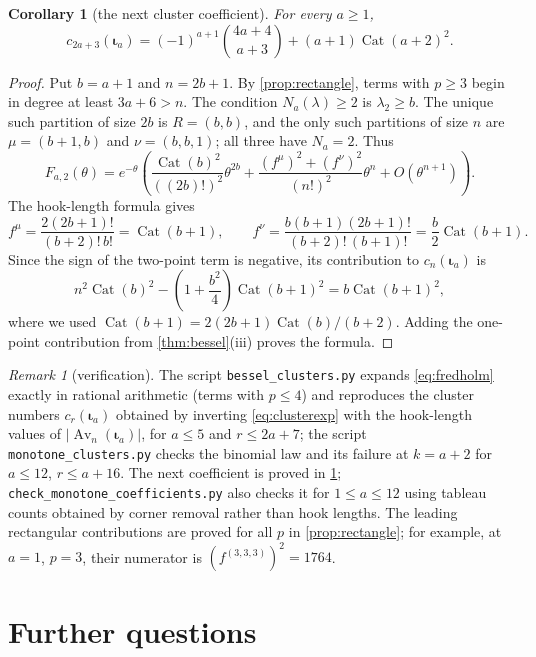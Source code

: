 \documentclass[11pt,reqno]{amsart}
\theoremstyle{plain}
\newtheorem{corollary}[corollary]{Corollary}
\theoremstyle{definition}
\theoremstyle{remark}
\newtheorem{remark}[remark]{Remark}
\newcommand{\Av}{\operatorname{Av}}
\newcommand{\Cat}{\operatorname{Cat}}
\let\greekiota\iota
\renewcommand{\iota}{\boldsymbol{\greekiota}}
\begin{document}
\begin{corollary}[the next cluster coefficient]\label{cor:bessel-next}
For every $a\ge1$,
\[
c_{2a+3}(\iota_a)=(-1)^{a+1}\binom{4a+4}{a+3}
 +(a+1)\Cat(a+2)^2.
\]
\end{corollary}

\begin{proof}
Put $b=a+1$ and $n=2b+1$. By \cref{prop:rectangle}, terms with
$p\ge3$ begin in degree at least $3a+6>n$. The condition
$N_a(\lambda)\ge2$ is $\lambda_2\ge b$. The unique such partition
of size $2b$ is $R=(b,b)$, and the only such partitions of size
$n$ are $\mu=(b+1,b)$ and $\nu=(b,b,1)$; all three have
$N_a=2$. Thus
\[
F_{a,2}(\theta)=e^{-\theta}\left(
 \frac{\Cat(b)^2}{((2b)!)^2}\theta^{2b}
 +\frac{(f^\mu)^2+(f^\nu)^2}{(n!)^2}\theta^n
 +O(\theta^{n+1})\right).
\]
The hook-length formula gives
\[
f^\mu=\frac{2(2b+1)!}{(b+2)!\,b!}=\Cat(b+1),\qquad
f^\nu=\frac{b(b+1)(2b+1)!}{(b+2)!\,(b+1)!}
 =\frac b2\Cat(b+1).
\]
Since the sign of the two-point term is negative, its contribution
to $c_n(\iota_a)$ is
\[
n^2\Cat(b)^2-\left(1+\frac{b^2}{4}\right)\Cat(b+1)^2
=b\Cat(b+1)^2,
\]
where we used $\Cat(b+1)=2(2b+1)\Cat(b)/(b+2)$.
Adding the one-point contribution from \cref{thm:bessel}(iii)
proves the formula.
\end{proof}

\begin{remark}[verification]\label{rem:besseldata}
The script \texttt{bessel\_clusters.py} expands \eqref{eq:fredholm} exactly in rational arithmetic (terms with $p\le4$) and reproduces the cluster numbers $c_r(\iota_a)$ obtained by inverting \eqref{eq:clusterexp} with the hook-length values of $|\Av_n(\iota_a)|$, for $a\le5$ and $r\le2a+7$; the script \texttt{monotone\_clusters.py} checks the binomial law and its failure at $k=a+2$ for $a\le12$, $r\le a+16$. The next coefficient is proved in \cref{cor:bessel-next};
\texttt{check\_monotone\_coefficients.py} also checks it for $1\le a\le12$
using tableau counts obtained by corner removal rather than hook lengths.
The leading rectangular contributions are proved for all $p$ in
\cref{prop:rectangle}; for example, at $a=1$, $p=3$, their numerator is
$(f^{(3,3,3)})^2=1764$.
\end{remark}

\section{Further questions}\label{sec:questions}
\end{document}
